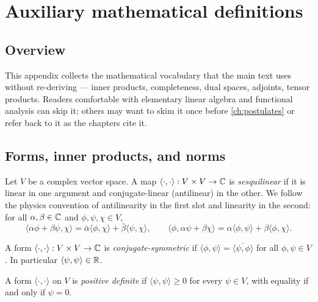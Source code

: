 \chapter{Auxiliary mathematical definitions}
\label{app:aux-defs}

\section*{Overview}

This appendix collects the mathematical vocabulary that the main
text uses without re-deriving --- inner products, completeness,
dual spaces, adjoints, tensor products. Readers comfortable with
elementary linear algebra and functional analysis can skip it;
others may want to skim it once before \cref{ch:postulates} or
refer back to it as the chapters cite it.

\section{Forms, inner products, and norms}
\label{app:inner-product}

\begin{definition}
\label{def:sesquilinear}
Let $V$ be a complex vector space. A map
$\langle\cdot,\cdot\rangle:V\times V\to\mathbb{C}$ is \emph{sesquilinear}
if it is linear in one argument and conjugate-linear (antilinear)
in the other. We follow the physics convention of antilinearity in
the first slot and linearity in the second: for all
$\alpha,\beta\in\mathbb{C}$ and $\phi,\psi,\chi\in V$,
\begin{equation}
\langle\alpha\phi+\beta\psi,\chi\rangle
= \bar\alpha\langle\phi,\chi\rangle + \bar\beta\langle\psi,\chi\rangle,
\qquad
\langle\phi,\alpha\psi+\beta\chi\rangle
= \alpha\langle\phi,\psi\rangle + \beta\langle\phi,\chi\rangle.
\end{equation}
\end{definition}

\begin{definition}
\label{def:conj-sym}
A form $\langle\cdot,\cdot\rangle:V\times V\to\mathbb{C}$ is
\emph{conjugate-symmetric} if
$\langle\phi,\psi\rangle=\overline{\langle\psi,\phi\rangle}$ for
all $\phi,\psi\in V$. In particular
$\langle\psi,\psi\rangle\in\mathbb{R}$.
\end{definition}

\begin{definition}
\label{def:positive-definite}
A form $\langle\cdot,\cdot\rangle$ on $V$ is
\emph{positive definite} if $\langle\psi,\psi\rangle\geq0$ for
every $\psi\in V$, with equality if and only if $\psi=0$.
\end{definition}

